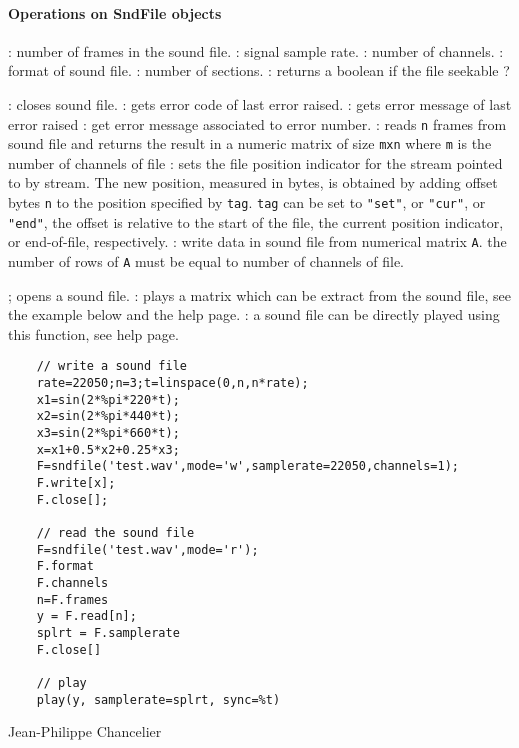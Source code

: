 \paragraph{Operations on SndFile objects}
\begin{itemize}
  : number of frames in the sound file. 
  : signal sample rate.
  : number of channels. 
  :  format of sound file. 
  : number of sections.
  : returns a boolean if the file seekable ? 
\end{itemize}
\begin{itemize}
  : closes sound file. 
  : gets error code of last error raised. 
  : gets error message of last error raised
  : get error message associated to error number.
  :  reads \verb+n+ frames from sound file and returns the 
  result in a numeric matrix of size \verb+mxn+ where \verb+m+ is the 
  number of channels of file
  : sets the file position indicator for the stream pointed
       to by stream.  The new position, measured in bytes, is obtained  by  adding
       offset  bytes \verb+n+  to  the  position  specified by \verb+tag+. 
        \verb+tag+ can be set to \verb+"set"+, or \verb+"cur"+, or \verb+"end"+, 
	the offset is relative to the start of the
       file, the current position indicator, or end-of-file, respectively.
  : write data in sound file from numerical matrix \verb+A+. 
  the number of rows of \verb+A+ must be equal to number of channels of file.
\end{itemize}

\begin{itemize}
  ; opens a sound file. 
  : plays a matrix which can be extract from the sound file, see the example below and the  help page.
  : a sound file can be directly played using this function, see  help page.
\end{itemize}

\begin{examples}
  \begin{Verbatim}
    // write a sound file
    rate=22050;n=3;t=linspace(0,n,n*rate);
    x1=sin(2*%pi*220*t);
    x2=sin(2*%pi*440*t);
    x3=sin(2*%pi*660*t);
    x=x1+0.5*x2+0.25*x3;
    F=sndfile('test.wav',mode='w',samplerate=22050,channels=1);
    F.write[x];
    F.close[];

    // read the sound file
    F=sndfile('test.wav',mode='r');
    F.format
    F.channels
    n=F.frames
    y = F.read[n];
    splrt = F.samplerate
    F.close[]

    // play 
    play(y, samplerate=splrt, sync=%t)
  \end{Verbatim}
\end{examples}

\begin{manseealso}

\end{manseealso}

\begin{authors}
  Jean-Philippe Chancelier 
\end{authors}

